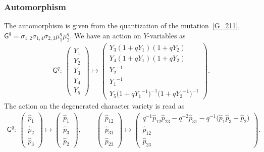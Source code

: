 \documentclass[10pt,a4paper]{amsart}
\numberwithin{equation}{section}
\begin{document}
\subsubsection*{Automorphism}
The automorphism is given from the quantization of the mutation~\eqref{G_211}, $\mathsf{G}^q=\sigma_{1,2} \sigma_{1,4} \sigma_{2,3}\mu^q_1 \mu^q_2$. We have an action on $Y$-variables as
\begin{gather*}
 \mathsf{G}^q \colon \
 \begin{pmatrix}
 Y_1 \\ Y_2 \\ Y_3 \\ Y_4 \\ Y_5
 \end{pmatrix}
 \mapsto
 \begin{pmatrix}
 Y_3 ( 1 + q Y_1 ) ( 1 + q Y_2 ) \\
 Y_4 ( 1 + q Y_1 ) ( 1 + q Y_2 ) \\
 {Y_2}^{-1} \\
 {Y_1}^{-1} \\
 Y_5 \big( 1 + q {Y_1}^{-1} \big)^{-1} \big( 1 + q {Y_2}^{-1} \big)^{-1}
 \end{pmatrix} .
\end{gather*}
The action on the degenerated character variety is read as
\begin{gather*}
 \mathsf{G}^q\colon \
 \begin{pmatrix}
 \hat{p}_1 \\ \hat{p}_2 \\ \hat{p}_3
 \end{pmatrix}
 \mapsto
 \begin{pmatrix}
 \hat{p}_1 \\ \hat{p}_3 \\ \hat{p}_2
 \end{pmatrix} , \qquad
 \begin{pmatrix}
 \hat{p}_{12} \\
 \hat{p}_{31} \\
 \hat{p}_{23}
 \end{pmatrix}
 \mapsto
 \begin{pmatrix}
 q^{-1} \hat{p}_{12} \hat{p}_{23} - q^{-2} \hat{p}_{31} - q^{-1} \big( \hat{p}_1 \hat{p}_3 + \hat{p}_2 \big) \\
 \hat{p}_{12} \\
 \hat{p}_{23}
 \end{pmatrix} .
\end{gather*}
\end{document}
